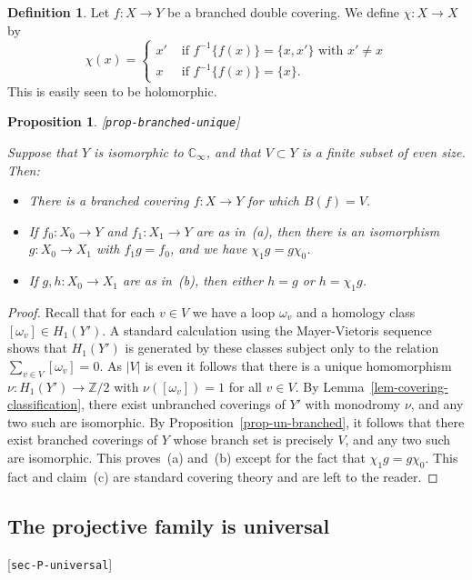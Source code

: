 \documentclass[reqno]{amsart}
\newcommand{\lbl}[1]{\label{#1}\textup{[\texttt{#1}]}\par}
\newcommand{\lbl}{\label}
\newcommand{\om}        {\omega}
\newcommand{\Z}         {{\mathbb{Z}}}
\newcommand{\C}         {{\mathbb{C}}}
\renewcommand{\:}{\colon}
\newtheorem{proposition}[theorem]{Proposition}
\theoremstyle{definition}
\newtheorem{definition}[theorem]{Definition}
\begin{document}
\begin{definition}
 Let $f\:X\to Y$ be a branched double covering.  We define
 $\chi\:X\to X$ by
 \[ \chi(x) = \begin{cases}
                x' & \text{ if } f^{-1}\{f(x)\} = \{x,x'\}
                      \text{ with } x'\neq x \\
                x  & \text{ if } f^{-1}\{f(x)\} = \{x\}.
              \end{cases}
 \]
 This is easily seen to be holomorphic.
\end{definition}

\begin{proposition}\lbl{prop-branched-unique}
 Suppose that $Y$ is isomorphic to $\C_\infty$, and that $V\subset Y$
 is a finite subset of even size.  Then:
 \begin{itemize}
  \item[(a)] There is a branched covering $f\:X\to Y$ for which
   $B(f)=V$.
  \item[(b)] If $f_0\:X_0\to Y$ and $f_1\:X_1\to Y$ are as in~(a),
   then there is an isomorphism $g\:X_0\to X_1$ with $f_1g=f_0$, and
   we have $\chi_1g=g\chi_0$.
  \item[(c)] If $g,h\:X_0\to X_1$ are as in~(b), then either $h=g$
   or $h=\chi_1g$.
 \end{itemize}
\end{proposition}
\begin{proof}
 Recall that for each $v\in V$ we have a loop $\om_v$ and a homology
 class $[\om_v]\in H_1(Y')$.  A standard calculation using the
 Mayer-Vietoris sequence shows that $H_1(Y')$ is generated by these
 classes subject only to the relation $\sum_{v\in V}[\om_v]=0$.  As
 $|V|$ is even it follows that there is a unique homomorphism
 $\nu\:H_1(Y')\to\Z/2$ with $\nu([\om_v])=1$ for all $v\in V$.  By
 Lemma~\ref{lem-covering-classification}, there exist unbranched
 coverings of $Y'$ with monodromy $\nu$, and any two such are
 isomorphic.  By Proposition~\ref{prop-un-branched}, it follows that
 there exist branched coverings of $Y$ whose branch set is precisely
 $V$, and any two such are isomorphic.  This proves~(a) and~(b) except
 for the fact that $\chi_1g=g\chi_0$.  This fact and claim~(c) are
 standard covering theory and are left to the reader.
\end{proof}


\subsection{The projective family is universal}
\lbl{sec-P-universal}
\end{document}

